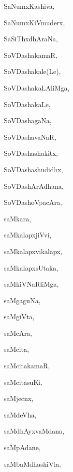 \begin{multicols}{3}
{\noindent
{SaNumxKashiva}, \pageref{SaNumxKashiva}

\noindent
{SaNumxKiVmuderx}, \pageref{SaNumxKiVmuderx}

\noindent
{SaSiThxdhAraNa}, \pageref{SaSiThxdhAraNa}

\noindent
{SoVDashakamaR}, \pageref{SoVDashakamaR}

\noindent
{SoVDashakale(Le)}, \pageref{SoVDashakaleLe}

\noindent
{SoVDashakaLAliMga}, \pageref{SoVDashakaLAliMga}

\noindent
{SoVDashakaLe}, \pageref{SoVDashakaLe}

\noindent
{SoVDashagaNa}, \pageref{SoVDashagaNa}

\noindent
{SoVDashavaNaR}, \pageref{SoVDashavaNaR}

\noindent
{SoVDashashakitx}, \pageref{SoVDashashakitx}

\noindent
{SoVDashashudidhx}, \pageref{SoVDashashudidhx}

\noindent
{SoVDashArAdhana}, \pageref{SoVDashArAdhana}

\noindent
{SoVDashoVpacAra}, \pageref{SoVDashoVpacAra}

\noindent
{saMkara}, \pageref{saMkara}

\noindent
{saMkalapxjiVvi}, \pageref{saMkalapxjiVvi}

\noindent
{saMkalapxvikalapx}, \pageref{saMkalapxvikalapx}

\noindent
{saMkalapxsUtaka}, \pageref{saMkalapxsUtaka}

\noindent
{saMkiVNaRliMga}, \pageref{saMkiVNaRliMga}

\noindent
{saMgaguNa}, \pageref{saMgaguNa}

\noindent
{saMgiVta}, \pageref{saMgiVta}

\noindent
{saMcAra}, \pageref{saMcAra}

\noindent
{saMcita}, \pageref{saMcita}

\noindent
{saMcitakamaR}, \pageref{saMcitakamaR}

\noindent
{saMcitasuKi}, \pageref{saMcitasuKi}

\noindent
{saMjecnx}, \pageref{saMjecnx}

\noindent
{saMdeVha}, \pageref{saMdeVha}

\noindent
{saMdhAyxvaMdana}, \pageref{saMdhAyxvaMdana}

\noindent
{saMpAdane}, \pageref{saMpAdane}

\noindent
{saMbaMdhashiVla}, \pageref{saMbaMdhashiVla}

}
\end{multicols}
